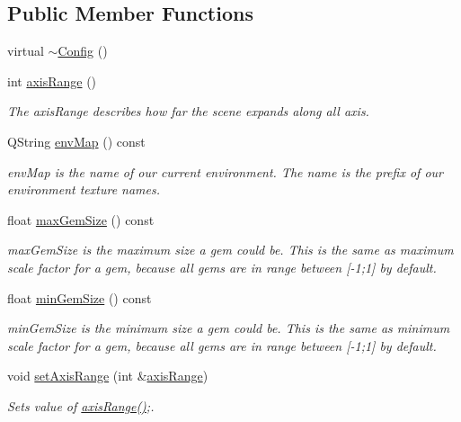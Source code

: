 \subsection*{Public Member Functions}
\begin{DoxyCompactItemize}
\item 
virtual \hyperlink{class_config_a543dce59b66475c5108088ee4ce1cdfc}{$\sim$\+Config} ()
\item 
int \hyperlink{class_config_a17e5e932c588503e186f40c2bcff3149}{axis\+Range} ()
\begin{DoxyCompactList}\small\item\em The axis\+Range describes how far the scene expands along all axis. \end{DoxyCompactList}\item 
Q\+String \hyperlink{class_config_ada50183c56178ba20a6d91193901434e}{env\+Map} () const 
\begin{DoxyCompactList}\small\item\em env\+Map is the name of our current environment. The name is the prefix of our environment texture names. \end{DoxyCompactList}\item 
float \hyperlink{class_config_a55adaaba8e9105c2047f485fc1ff737e}{max\+Gem\+Size} () const 
\begin{DoxyCompactList}\small\item\em max\+Gem\+Size is the maximum size a gem could be.  This is the same as maximum scale factor for a gem, because all gems are in range between \mbox{[}-\/1;1\mbox{]} by default. \end{DoxyCompactList}\item 
float \hyperlink{class_config_af5183a4e104ff4d86f112359199a861f}{min\+Gem\+Size} () const 
\begin{DoxyCompactList}\small\item\em min\+Gem\+Size is the minimum size a gem could be.  This is the same as minimum scale factor for a gem, because all gems are in range between \mbox{[}-\/1;1\mbox{]} by default. \end{DoxyCompactList}\item 
void \hyperlink{class_config_ab6e130f2988e1ee72e81e853865708ba}{set\+Axis\+Range} (int \&\hyperlink{class_config_a5068b92866fd941b72314c6c7f36145f}{axis\+Range})
\begin{DoxyCompactList}\small\item\em Sets value of \hyperlink{class_config_a17e5e932c588503e186f40c2bcff3149}{axis\+Range()};. \end{DoxyCompactList}\item 

\end{DoxyCompactItemize}
